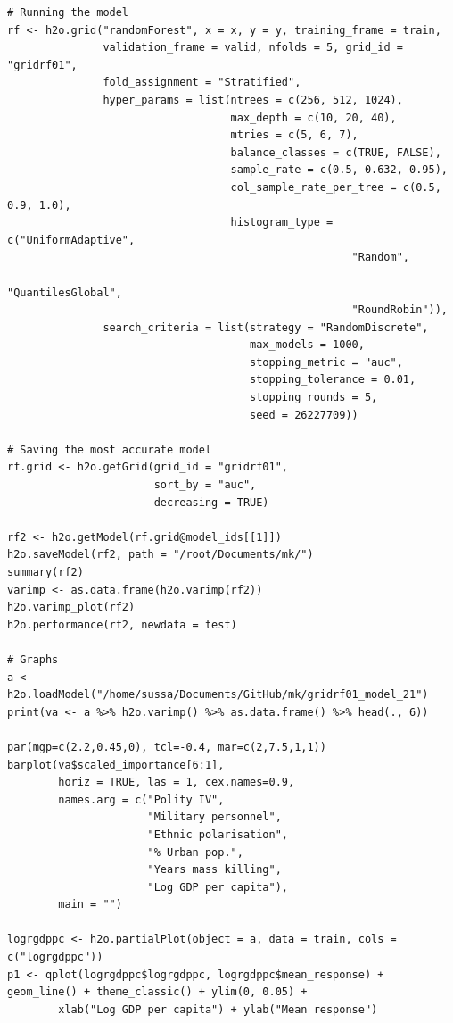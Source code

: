 \documentclass[a4paper,12pt]{article}
\begin{document}
\begin{verbatim}
# Running the model
rf <- h2o.grid("randomForest", x = x, y = y, training_frame = train, 
               validation_frame = valid, nfolds = 5, grid_id = "gridrf01",
               fold_assignment = "Stratified",
               hyper_params = list(ntrees = c(256, 512, 1024),
                                   max_depth = c(10, 20, 40),
                                   mtries = c(5, 6, 7),
                                   balance_classes = c(TRUE, FALSE),
                                   sample_rate = c(0.5, 0.632, 0.95),
                                   col_sample_rate_per_tree = c(0.5, 0.9, 1.0),
                                   histogram_type = c("UniformAdaptive",
                                                      "Random",
                                                      "QuantilesGlobal",
                                                      "RoundRobin")),
               search_criteria = list(strategy = "RandomDiscrete", 
                                      max_models = 1000, 
                                      stopping_metric = "auc", 
                                      stopping_tolerance = 0.01, 
                                      stopping_rounds = 5, 
                                      seed = 26227709)) 

# Saving the most accurate model
rf.grid <- h2o.getGrid(grid_id = "gridrf01",
                       sort_by = "auc",
                       decreasing = TRUE)

rf2 <- h2o.getModel(rf.grid@model_ids[[1]])
h2o.saveModel(rf2, path = "/root/Documents/mk/")
summary(rf2)
varimp <- as.data.frame(h2o.varimp(rf2))
h2o.varimp_plot(rf2)
h2o.performance(rf2, newdata = test)

# Graphs
a <- h2o.loadModel("/home/sussa/Documents/GitHub/mk/gridrf01_model_21")
print(va <- a %>% h2o.varimp() %>% as.data.frame() %>% head(., 6)) 

par(mgp=c(2.2,0.45,0), tcl=-0.4, mar=c(2,7.5,1,1))
barplot(va$scaled_importance[6:1],
        horiz = TRUE, las = 1, cex.names=0.9,
        names.arg = c("Polity IV", 
                      "Military personnel",
                      "Ethnic polarisation", 
                      "% Urban pop.",
                      "Years mass killing",
                      "Log GDP per capita"),
        main = "")

logrgdppc <- h2o.partialPlot(object = a, data = train, cols = c("logrgdppc"))
p1 <- qplot(logrgdppc$logrgdppc, logrgdppc$mean_response) + geom_line() + theme_classic() + ylim(0, 0.05) +
        xlab("Log GDP per capita") + ylab("Mean response")


\end{verbatim}
\end{document}
